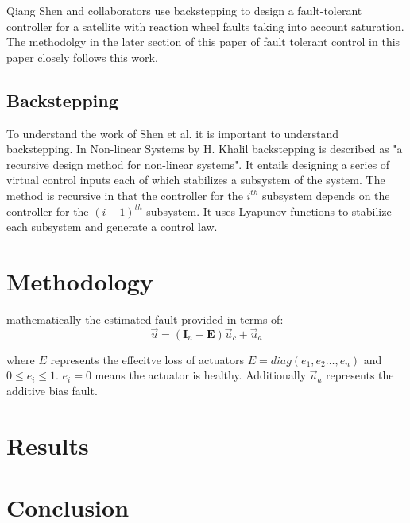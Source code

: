 Qiang Shen and collaborators \cite{shenActiveFaulttolerantControl2019} use backstepping to design a fault-tolerant controller for a satellite with reaction wheel faults taking into account saturation. The methodolgy in the later section of this paper of fault tolerant control in this paper closely follows this work.

\subsection{Backstepping}
To understand the work of Shen et al. \cite{shenActiveFaulttolerantControl2019} it is important to understand backstepping. In Non-linear Systems by H. Khalil \cite{khalilNonlinearSystems2002} backstepping is described as "a recursive design method for non-linear systems". It entails designing a series of virtual control inputs each of which stabilizes a subsystem of the system. The method is recursive in that the controller for the $i^{th}$ subsystem depends on the controller for the $(i-1)^{th}$ subsystem. It uses Lyapunov functions to stabilize each subsystem and generate a control law.



\section{Methodology}

mathematically the estimated fault provided in terms of:
$$\vec{u}=(\mathbf{I}_{n}-\mathbf{E})\vec{u}_{c}+\vec{u}_{a}$$

where $E$ represents the effecitve loss of actuators $E=diag(e_{1},e_{2}\dots,e_{n})$ and $0\leq e_{i}\leq 1$. $e_{i}=0$ means the actuator is healthy. Additionally $\vec{u}_{a}$ represents the additive bias fault.

\section{Results}

\section{Conclusion}